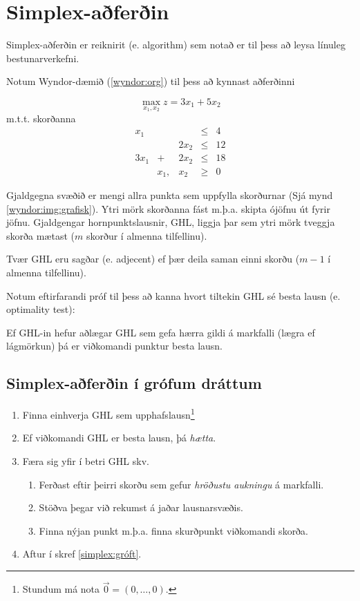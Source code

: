 \lstset{language=awk}

\section{Simplex-aðferðin}
Simplex-aðferðin er reiknirit (e. algorithm) sem notað er til þess að leysa línuleg bestunarverkefni.

Notum Wyndor-dæmið (\ref{wyndor:org}) til þess að kynnast aðferðinni
\begin{daemi}
$$\max_{x_1,x_2} z=3x_1+5x_2 $$
m.t.t. skorðanna
\[\begin{array}{ccccc}
 x_1 & && \leq & 4 \\
 & &2x_2 & \leq &12 \\
 3x_1& + &2x_2&\leq&18\\
 &x_1,&x_2&\geq&0
\end{array}\] 
\end{daemi}
Gjaldgegna svæðið er mengi allra punkta sem uppfylla skorðurnar (Sjá mynd \ref{wyndor:img:grafisk}). Ytri mörk skorðanna fást m.þ.a. skipta ójöfnu út fyrir jöfnu. Gjaldgengar hornpunktslausnir, GHL, liggja þar sem ytri mörk tveggja skorða mætast ($m$ skorður í almenna tilfellinu).

Tvær GHL eru sagðar  (e. adjecent) ef þær deila saman einni skorðu ($m-1$ í almenna tilfellinu).

Notum eftirfarandi próf til þess að kanna hvort tiltekin GHL sé besta lausn (e. optimality test):
\begin{setn}
 Ef GHL-in hefur aðlægar GHL sem gefa hærra gildi á markfalli (lægra ef lágmörkun) þá er viðkomandi punktur besta lausn.
\end{setn}
\newpage
\subsection{Simplex-aðferðin í grófum dráttum}
\begin{enumerate}
 \item Finna einhverja GHL sem upphafslausn\footnote{Stundum má nota $\vec{0}=(0,\ldots,0)$.}
 \item Ef viðkomandi GHL er besta lausn, þá \emph{hætta}.\label{simplex:gróft}
 \item Færa sig yfir í betri GHL skv.
 \begin{enumerate}[label=(\roman{*})]
  \item Ferðast eftir þeirri skorðu sem gefur \emph{hröðustu aukningu} á markfalli.
  \item Stöðva þegar við rekumst á jaðar lausnarsvæðis.
  \item Finna nýjan punkt m.þ.a. finna skurðpunkt viðkomandi skorða.
 \end{enumerate}
 \item Aftur í skref \ref{simplex:gróft}.
\end{enumerate}

